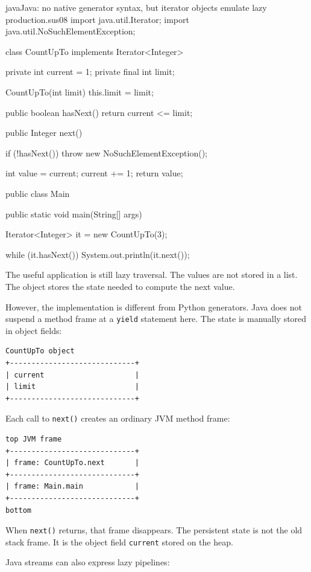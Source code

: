 \begin{codebox}[]{java}{Java: no native generator syntax, but iterator objects emulate lazy production.}{sus08}
import java.util.Iterator;
import java.util.NoSuchElementException;

class CountUpTo implements Iterator<Integer> {
    private int current = 1;
    private final int limit;

    CountUpTo(int limit) {
        this.limit = limit;
    }

    public boolean hasNext() {
        return current <= limit;
    }

    public Integer next() {
        if (!hasNext()) {
            throw new NoSuchElementException();
        }

        int value = current;
        current += 1;
        return value;
    }
}

public class Main {
    public static void main(String[] args) {
        Iterator<Integer> it = new CountUpTo(3);

        while (it.hasNext()) {
            System.out.println(it.next());
        }
    }
}
\end{codebox}


The useful application is still lazy traversal. The values are not stored in a list. The object stores the state needed to compute the next value.

However, the implementation is different from Python generators. Java does not suspend a method frame at a \texttt{yield} statement here. The state is manually stored in object fields:

\begin{verbatim}
CountUpTo object
+-----------------------------+
| current                     |
| limit                       |
+-----------------------------+
\end{verbatim}

Each call to \texttt{next()} creates an ordinary JVM method frame:

\begin{verbatim}
top JVM frame
+-----------------------------+
| frame: CountUpTo.next       |
+-----------------------------+
| frame: Main.main            |
+-----------------------------+
bottom
\end{verbatim}

When \texttt{next()} returns, that frame disappears. The persistent state is not the old stack frame. It is the object field \texttt{current} stored on the heap.

Java streams can also express lazy pipelines:


